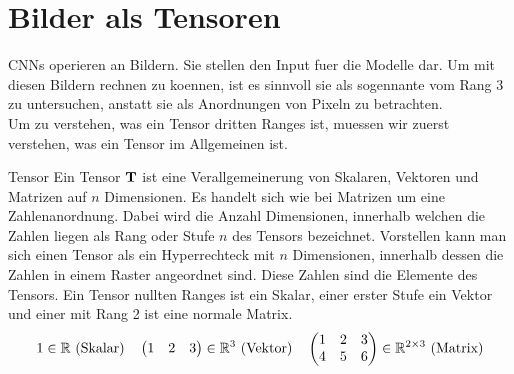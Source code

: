 \section{Bilder als Tensoren}
CNNs operieren an Bildern. Sie stellen den Input fuer die Modelle dar.
Um mit diesen Bildern rechnen zu koennen, ist es sinnvoll sie als sogennante
 vom Rang 3 zu untersuchen, anstatt sie als Anordnungen von
Pixeln zu betrachten. \\
Um zu verstehen, was ein Tensor dritten Ranges ist, muessen wir zuerst verstehen, was ein Tensor im Allgemeinen ist.

\begin{defbox}{Tensor}
  Ein Tensor $\mathbf{T}$ ist eine Verallgemeinerung von Skalaren, Vektoren und Matrizen auf
  $n$ Dimensionen. Es handelt sich wie bei Matrizen um
  eine Zahlenanordnung. Dabei wird die Anzahl Dimensionen, innerhalb welchen die
  Zahlen liegen als Rang oder Stufe $n$ des Tensors bezeichnet. Vorstellen kann man sich einen Tensor
  als ein Hyperrechteck mit $n$ Dimensionen, innerhalb dessen die Zahlen in
  einem Raster angeordnet sind. Diese Zahlen sind die Elemente des Tensors.
  Ein Tensor nullten Ranges ist ein Skalar, einer erster Stufe ein Vektor und
  einer mit Rang 2 ist eine normale Matrix.
  \begin{gather*}
    1 \in \mathbb{R} \text{ (Skalar)} \quad \begin{pmatrix} 1 & 2 & 3 \end{pmatrix}
    \in \mathbb{R}^3 \text{ (Vektor)} \quad
    \begin{pmatrix}
      1 & 2 & 3 \\
      4 & 5 & 6 \\
    \end{pmatrix} \in \mathbb{R}^{2 \times 3} \text{ (Matrix)}
  \end{gather*}
\end{defbox}

